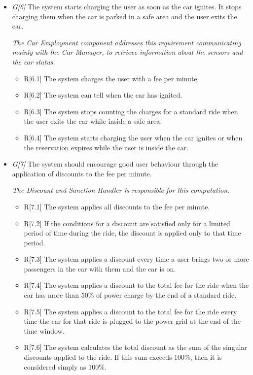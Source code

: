\begin{itemize}
\begin{itemize}
	\end{itemize}

\item \textit{G[6]} The system starts charging the user as soon as the car ignites. It stops charging them when the car is parked in a safe area and the user exits the car.

	\textit{The Car Employment component addresses this requirement communicating mainly with the Car Manager, to retrieve information about the sensors and the car status.}

	\begin{itemize}
		\item R[6.1] The system charges the user with a fee per minute.
		\item R[6.2] The system can tell when the car has ignited. 
		\item R[6.3] The system stops counting the charges for a standard ride when the user exits the car while inside a safe area.
		\item R[6.4] The system starts charging the user when the car ignites or when the reservation expires while the user is inside the car.
	\end{itemize}
	
\item \textit{G[7]} The system should encourage good user behaviour through the application of discounts to the fee per minute.

	\textit{The Discount and Sanction Handler is responsible for this computation.}

	\begin{itemize}
		\item R[7.1] The system applies all discounts to the fee per minute.
		\item R[7.2] If the conditions for a discount are satisfied only for a limited period of time during the ride, the discount is applied only to that time period.
		\item R[7.3] The system applies a discount every time a user brings two or more passengers in the car with them and the car is on.
		\item R[7.4] The system applies a discount to the total fee for the ride when the car has more than 50\% of power charge by the end of a standard ride.
		\item R[7.5] The system applies a discount to the total fee for the ride every time the car for that ride is plugged to the power grid at the end of the time window. 
		\item R[7.6] The system calculates the total discount as the sum of the singular discounts applied to the ride. If this sum exceeds 100\%, then it is considered simply as 100\%.


\end{itemize}
\end{itemize}
